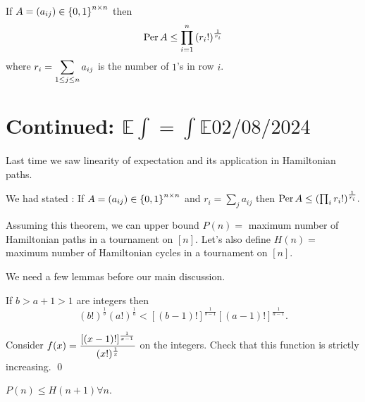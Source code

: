 \begin{thm}\label{perm}
If $A=(a_{ij})\in\left\{0,1\right\}^{n\times n}$ then $$\displaystyle\operatorname{Per} A \leq \prod_{i=1}^n \left(r_i!\right)^{\frac{1}{r_i}}$$ where $\displaystyle r_i = \sum_{1\leq j\leq n}a_{ij}$ is the number of $1$'s in row $i$.
\end{thm}


\chapter{Continued: $\mathbb E\int = \int\mathbb E$\hfill \small $02/08/2024\qquad$}

Last time we saw linearity of expectation and its application in Hamiltonian paths. 

We had stated : If $A=(a_{ij})\in \left\{0,1\right\}^{n\times n}$ and $r_i = \sum_j a_{ij}$ then $\operatorname{Per} A\leq (\prod_i r_i!)^{\frac{1}{r_i}}.$ 

Assuming this theorem, we can upper bound $P(n) = $ maximum number of Hamiltonian paths in a tournament on $[n]$. Let's also define $H(n) = $ maximum number of Hamiltonian cycles in a tournament on $[n]$.

We need a few lemmas before our main discussion.

\begin{lemma}
If $b>a+1>1$ are integers then $$(b!)^{\frac1b}(a!)^{\frac1a} < \left[(b-1)!\right]^{\frac1{b-1}}[(a-1)!]^{\frac1{a-1}}.$$
\end{lemma}
\begin{pf}
Consider $\displaystyle f(x) = \frac{[(x-1)!]^{\frac1{x-1}}}{(x!)^{\frac1x}}$ on the integers. Check that this function is strictly increasing.
\qed\end{pf}

\begin{lemma}
$P(n)\leq H(n+1)\forall n$.
\end{lemma}

